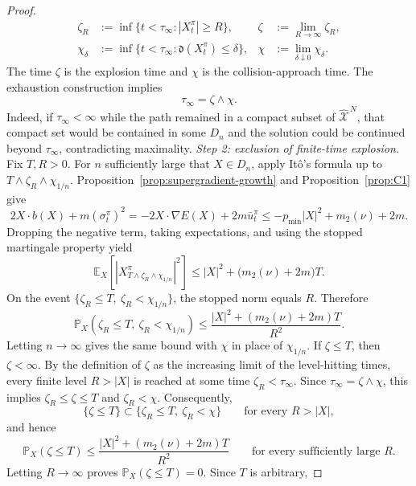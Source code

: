 \documentclass[11pt]{article}
\def\E{\mathbb{E}}
\def\P{\mathbb{P}}
\def\Xc{{\mathcal X}}
\def\hX{\widehat{\Xc}^{\,N}}
\newcommand{\pmin}{p_{\min}}
\theoremstyle{definition}
\theoremstyle{remark}
\numberwithin{equation}{section}
\begin{document}
\begin{proof}
\begin{align}
 \zeta_R&:=\inf\{t<\tau_\infty:|X_t^\pi|\ge R\},
 &\zeta&:=\lim_{R\to\infty}\zeta_R,
 \label{eq:explosion-times-control}\\
 \chi_\delta&:=\inf\{t<\tau_\infty:\mathfrak d(X_t^\pi)\le\delta\},
 &\chi&:=\lim_{\delta\downarrow0}\chi_\delta.
 \label{eq:collision-times-control}
\end{align}
The time $\zeta$ is the explosion time and $\chi$ is the collision-approach time.  The exhaustion
construction implies
\begin{equation}\label{eq:lifetime-decomposition-control}
 \tau_\infty=\zeta\wedge\chi.
\end{equation}
Indeed, if $\tau_\infty<\infty$ while the path remained in a compact subset of $\hX$, that compact
set would be contained in some $D_n$ and the solution could be continued beyond $\tau_\infty$,
contradicting maximality.
\medskip
\noindent\textit{Step 2: exclusion of finite-time explosion.}
Fix $T,R>0$.  For $n$ sufficiently large that $X\in D_n$, apply It\^o's formula up to
$T\wedge\zeta_R\wedge\chi_{1/n}$.  Proposition~\ref{prop:supergradient-growth} and
Proposition~\ref{prop:C1} give
\begin{equation}\label{eq:drift-Lyapunov-control}
 2X\cdot b(X)+m(\sigma_t^\pi)^2
 =-2X\cdot\nabla E(X)+2m\bar u_t^\pi
 \le-\pmin|X|^2+m_2(\nu)+2m.
\end{equation}
Dropping the negative term, taking expectations, and using the stopped martingale property yield
\begin{equation}\label{eq:stopped-second-moment-control}
 \E_X\left[|X_{T\wedge\zeta_R\wedge\chi_{1/n}}^\pi|^2\right]
 \le |X|^2+\bigl(m_2(\nu)+2m\bigr)T.
\end{equation}
On the event
$\{\zeta_R\le T,\ \zeta_R<\chi_{1/n}\}$, the stopped norm equals $R$.  Therefore
\[
 \P_X(\zeta_R\le T,\ \zeta_R<\chi_{1/n})
 \le\frac{|X|^2+(m_2(\nu)+2m)T}{R^2}.
\]
Letting $n\to\infty$ gives the same bound with $\chi$ in place of $\chi_{1/n}$.
If $\zeta\le T$, then $\zeta<\infty$.  By the definition of $\zeta$ as the increasing
limit of the level-hitting times, every finite level $R>|X|$ is reached at some time
$\zeta_R<\tau_\infty$.  Since
$\tau_\infty=\zeta\wedge\chi$, this implies
$\zeta_R\le\zeta\le T$ and $\zeta_R<\chi$.  Consequently,
\[
 \{\zeta\le T\}\subset
 \{\zeta_R\le T,\ \zeta_R<\chi\}
 \qquad\text{for every }R>|X|,
\]
and hence
\[
 \P_X(\zeta\le T)
 \le\frac{|X|^2+(m_2(\nu)+2m)T}{R^2}
 \qquad\text{for every sufficiently large }R.
\]
Letting $R\to\infty$ proves $\P_X(\zeta\le T)=0$.  Since $T$ is arbitrary,

\end{proof}
\end{document}
